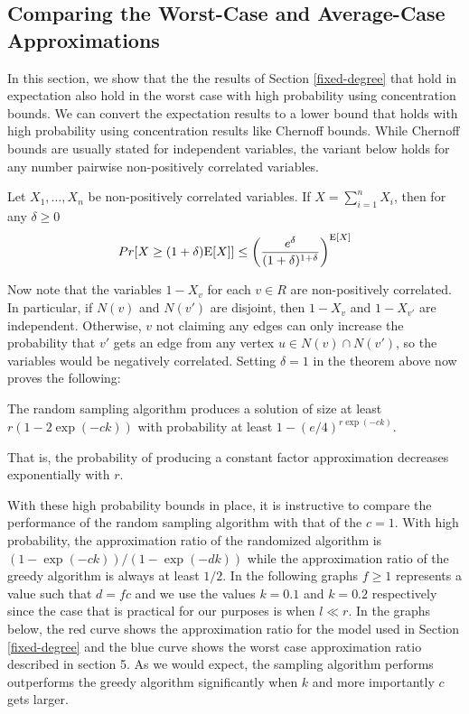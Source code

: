 \subsection{Comparing the Worst-Case and Average-Case Approximations}
In this section, we show that the the results of Section
\ref{fixed-degree} that hold in expectation also hold in the worst
case with high probability using concentration bounds. We can convert 
the expectation results to a lower bound that holds with high
probability using concentration results like Chernoff bounds. While
Chernoff bounds are usually stated for independent variables, the 
variant below holds for any number pairwise non-positively correlated
variables.

\begin{thm}
Let $X_1,\ldots, X_n$ be non-positively correlated variables. If $X=\sum_{i=1}^n X_i$, then for any $\delta\geq 0$
\[ Pr[X \geq (1+\delta)\text{E}[X] ] \leq \left(\frac{e^\delta}{(1+\delta)^{1+\delta}}\right)^{\text{E}[X]} \]
\end{thm}

Now note that the variables $1-X_v$ for each $v\in R$ are
non-positively correlated. In particular, if $N(v)$ and $N(v')$ are
disjoint, then $1-X_v$ and $1-X_{v'}$ are independent. Otherwise, $v$
not claiming any edges can only increase the probability that $v'$
gets an edge from any vertex $u\in N(v)\cap N(v')$, so the variables
would be negatively correlated. Setting $\delta=1$ in the
theorem above now proves the following:

\begin{thm}
The random sampling algorithm produces a solution of size at least $r(1-2\exp(-ck))$ with probability at least $1-(e/4)^{r\exp(-ck)}$.
\end{thm}

That is, the probability of producing a constant factor approximation decreases exponentially with $r$.

With these high probability bounds in place, it is instructive to
compare the performance of the random sampling algorithm with that of
the $c=1$. With high probability, the approximation ratio of the
randomized algorithm is $(1-\exp(-ck))/(1-\exp(-dk))$ while the
approximation ratio of the greedy algorithm is always at least
$1/2$. In the following graphs $f\geq 1$ represents a value such that
$d=fc$ and we use the values $k=0.1$ and $k=0.2$ respectively since
the case that is practical for our purposes is when $l \ll r$. In the
graphs below, the red curve shows the approximation ratio for the
model used in Section \ref{fixed-degree} and the blue curve shows the
worst case approximation ratio described in section 5. As we would
expect, the sampling algorithm performs outperforms the greedy
algorithm significantly when $k$ and more importantly $c$ gets larger.

